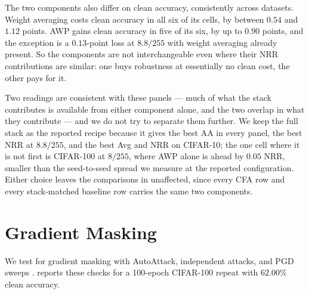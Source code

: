 The two components also differ on clean accuracy, consistently across datasets. Weight averaging
costs clean accuracy in all six of its cells, by between $0.54$ and $1.12$ points. AWP gains clean
accuracy in five of its six, by up to $0.90$ points, and the exception is a $0.13$-point loss at
$8.8/255$ with weight averaging already present. So the components are not interchangeable even where
their NRR contributions are similar: one buys robustness at essentially no clean cost, the other pays
for it.

Two readings are consistent with these panels --- much of what the stack contributes is available from
either component alone, and the two overlap in what they contribute --- and we do not try to separate
them further. We keep the full stack as the reported recipe because it gives the best AA in every
panel, the best NRR at $8.8/255$, and the best Avg and NRR on CIFAR-10; the one cell where it is not
first is CIFAR-100 at $8/255$, where AWP alone is ahead by $0.05$ NRR, smaller than the seed-to-seed
spread we measure at the reported configuration. Either choice leaves the comparisons in
 unaffected, since every CFA row and every stack-matched baseline row carries the same
two components.

\section{Gradient Masking}
\label{app:gradmask}

We test for gradient masking with AutoAttack, independent attacks, and PGD sweeps
\citep{athalye2018obfuscated}.  reports these checks for a 100-epoch CIFAR-100
repeat with $62.00\%$ clean accuracy.

